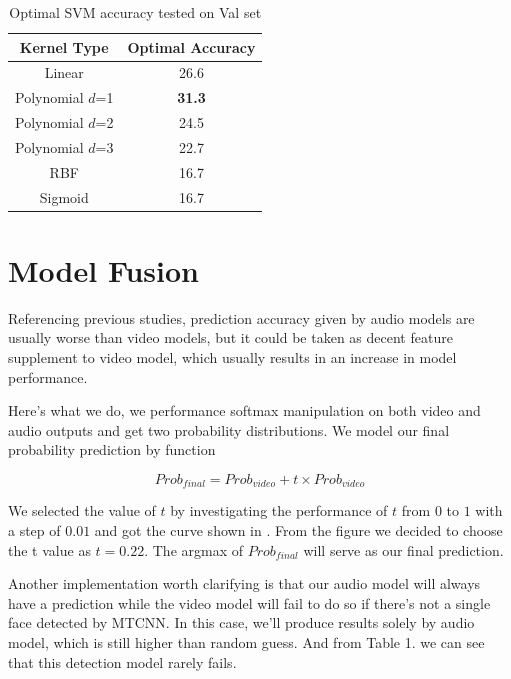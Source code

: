 \documentclass[10pt,twocolumn,letterpaper]{article}
\begin{document}
\begin{table}[htpb]
   \begin{center}
      \begin{tabular}{|c|c|}
         \hline
         \textbf{Kernel Type} & \textbf{Optimal Accuracy}\\
         \hline\hline
         Linear & 26.6\\
         \hline
         Polynomial $d$=1 & \textbf{31.3} \\
         \hline
         Polynomial $d$=2 & 24.5 \\
         \hline
         Polynomial $d$=3 & 22.7 \\
         \hline
         RBF & 16.7 \\
         \hline
         Sigmoid & 16.7 \\
         \hline
      \end{tabular}
   \end{center}
   \caption{Optimal SVM accuracy tested on Val set}
   \label{tableSVM}
\end{table}

\section{Model Fusion}

Referencing previous studies, prediction accuracy given by audio models are usually worse than video models, but it could be taken as decent feature supplement to video model, which usually results in an increase in model performance.

Here's what we do, we performance softmax manipulation on both video and audio outputs and get two probability distributions. We model our final probability prediction by function

\begin{equation}
Prob_{final} = Prob_{video} + t \times Prob_{video} 
\end{equation}

We selected the value of $t$ by investigating the performance of $t$ from $0$ to $1$ with a step of $0.01$ and got the curve shown in . From the figure we decided to choose the t value as $t=0.22$. The argmax of $Prob_{final}$ will serve as our final prediction.

Another implementation worth clarifying is that our audio model will always have a prediction while the video model will fail to do so if there's not a single face detected by MTCNN. In this case, we'll produce results solely by audio model, which is still higher than random guess. And from Table 1. we can see that this detection model rarely fails. 
\end{document}
